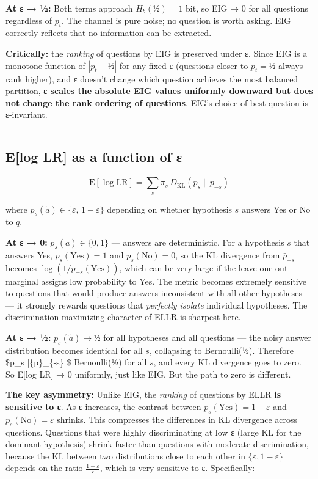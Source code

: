 \documentclass[
]{article}
\begin{document}
\textbf{At ε → ½:} Both terms approach \(H_b(½) = 1\) bit, so EIG → 0
for all questions regardless of \(p_t\). The channel is pure noise; no
question is worth asking. EIG correctly reflects that no information can
be extracted.

\textbf{Critically:} the \emph{ranking} of questions by EIG is preserved
under ε. Since EIG is a monotone function of \(|p_t - ½|\) for any fixed
ε (questions closer to \(p_t = ½\) always rank higher), and ε doesn't
change which question achieves the most balanced partition, \textbf{ε
scales the absolute EIG values uniformly downward but does not change
the rank ordering of questions}. EIG's choice of best question is
ε-invariant.

\begin{center}\rule{0.5\linewidth}{0.5pt}\end{center}

\subsection{E{[}log LR{]} as a function of
ε}\label{elog-lr-as-a-function-of-ux3b5}

\[\mathrm{E}[\log\mathrm{LR}] = \sum_s \pi_s\, D_{\mathrm{KL}}(p_s \| \bar{p}_{-s})\]

where \(p_s(\tilde{a}) \in \{\varepsilon,\, 1-\varepsilon\}\) depending
on whether hypothesis \(s\) answers Yes or No to \(q\).

\textbf{At ε → 0:} \(p_s(\tilde{a}) \in \{0, 1\}\) --- answers are
deterministic. For a hypothesis \(s\) that answers Yes,
\(p_s(\text{Yes}) = 1\) and \(p_s(\text{No}) = 0\), so the KL divergence
from \(\bar{p}_{-s}\) becomes \(\log(1/\bar{p}_{-s}(\text{Yes}))\),
which can be very large if the leave-one-out marginal assigns low
probability to Yes. The metric becomes extremely sensitive to questions
that would produce answers inconsistent with all other hypotheses --- it
strongly rewards questions that \emph{perfectly isolate} individual
hypotheses. The discrimination-maximizing character of ELLR is sharpest
here.

\textbf{At ε → ½:} \(p_s(\tilde{a}) → ½\) for all hypotheses and all
questions --- the noisy answer distribution becomes identical for all
\(s\), collapsing to Bernoulli(½). Therefore \$p\_s
\to \bar\{p\}\_\{-s\} \to \$ Bernoulli(½) for all \(s\), and every KL
divergence goes to zero. So E{[}log LR{]} → 0 uniformly, just like EIG.
But the path to zero is different.

\textbf{The key asymmetry:} Unlike EIG, the \emph{ranking} of questions
by ELLR \textbf{is sensitive to ε}. As ε increases, the contrast between
\(p_s(\text{Yes}) = 1-\varepsilon\) and \(p_s(\text{No}) = \varepsilon\)
shrinks. This compresses the differences in KL divergence across
questions. Questions that were highly discriminating at low ε (large KL
for the dominant hypothesis) shrink faster than questions with moderate
discrimination, because the KL between two distributions close to each
other in \(\{ε, 1-ε\}\) depends on the ratio
\(\frac{1-\varepsilon}{\varepsilon}\), which is very sensitive to ε.
Specifically:
\end{document}
